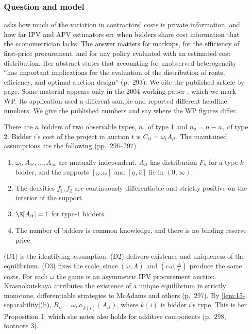 \subsubsection{Question and model}

\citet{Krasnokutskaya2011} asks how much of the variation in contractors' costs is private
information, and how far IPV and APV estimators err when bidders share cost information that the
econometrician lacks. The answer matters for markups, for the efficiency of first-price
procurement, and for any policy evaluated with an estimated cost distribution. Her abstract states
that accounting for unobserved heterogeneity ``has important implications for the evaluation of the
distribution of rents, efficiency, and optimal auction design'' (p.~293). We cite the published
article by page. Some material appears only in the 2004 working paper \citep{Krasnokutskaya2004},
which we mark WP. Its application used a different sample and reported different headline numbers.
We give the published numbers and say where the WP figures differ.

There are $n$ bidders of two observable types, $n_1$ of type 1 and $n_2=n-n_1$ of type 2. Bidder
$i$'s cost of the project in auction $t$ is $C_{it}=\omega_tA_{it}$. The maintained assumptions
are the following (pp.~296--297).
\begin{enumerate}[label=(D\arabic*)]
\item $\omega_t,A_{1t},\dots,A_{nt}$ are mutually independent. $A_{it}$ has distribution $F_{k}$ for a
type-$k$ bidder, and the supports $[\underline\omega,\bar\omega]$ and $[\underline a,\bar a]$ lie in
$(0,\infty)$.
\item The densities $f_1,f_2$ are continuously differentiable and strictly positive on the interior
of the support.
\item $\E[A_{it}]=1$ for type-1 bidders.
\item The number of bidders is common knowledge, and there is no binding reserve price.
\end{enumerate}
(D1) is the identifying assumption. (D2) delivers existence and uniqueness of the equilibrium. (D3)
fixes the scale, since $(\omega,A)$ and $(c\,\omega,\frac{A}{c})$ produce the same costs. For each
$\omega$ the game is an asymmetric IPV procurement auction. Krasnokutskaya attributes the existence of a
unique equilibrium in strictly monotone, differentiable strategies to McAdams and others (p.~297). By
\cref{lem:15-separability}(b), $B_{it}=\omega_t\,\alpha_{k(i)}(A_{it})$, where $k(i)$ is bidder $i$'s
type. This is her Proposition 1, which she notes also holds for additive components (p.~298,
footnote 3).

